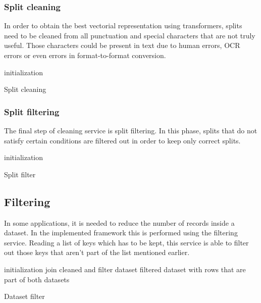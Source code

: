 \documentclass[\main/main.tex]{subfiles}
\begin{document}
\subsubsection{Split cleaning}
In order to obtain the best vectorial representation using transformers, splits need to be cleaned from all punctuation and special characters that are not truly useful. Those characters could be present in text due to human errors, OCR errors or even errors in format-to-format conversion.
\begin{center}
    \begin{algorithm}[H]
     initialization
     \caption{Split cleaning}
    \end{algorithm}
\end{center}
\subsubsection{Split filtering}
The final step of cleaning service is split filtering. In this phase, splits that do not satisfy certain conditions are filtered out in order to keep only correct splits.
\begin{center}
    \begin{algorithm}[H]
     initialization
     \caption{Split filter}
    \end{algorithm}
\end{center}

\subsection{Filtering}
In some applications, it is needed to reduce the number of records inside a dataset. In the implemented framework this is performed using the filtering service. Reading a list of keys which has to be kept, this service is able to filter out those keys that aren't part of the list mentioned earlier.
\begin{center}
    \begin{algorithm}[H]
     initialization
     join cleaned and filter dataset
     \Return filtered dataset with rows that are part of both datasets
     \caption{Dataset filter}
    \end{algorithm}
\end{center}
\end{document}
